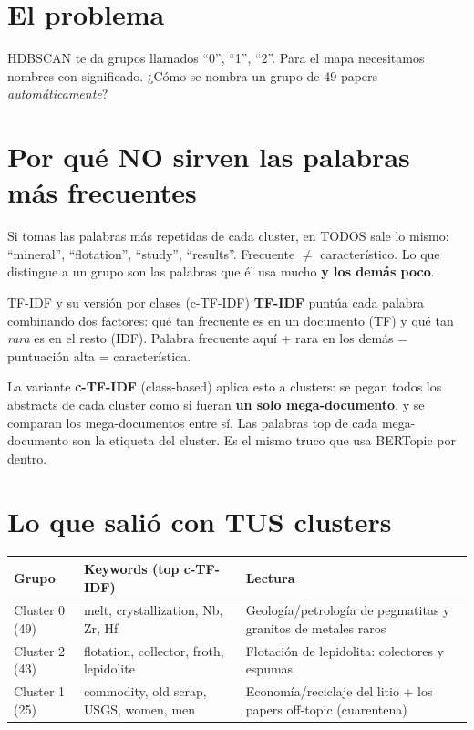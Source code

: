 \documentclass[11pt,a4paper]{article}
\begin{document}

\section{El problema}

HDBSCAN te da grupos llamados ``0'', ``1'', ``2''. Para el mapa necesitamos nombres con
significado. ¿Cómo se nombra un grupo de 49 papers \emph{automáticamente}?

\section{Por qué NO sirven las palabras más frecuentes}

Si tomas las palabras más repetidas de cada cluster, en TODOS sale lo mismo: ``mineral'',
``flotation'', ``study'', ``results''. Frecuente $\neq$ característico. Lo que distingue a un
grupo son las palabras que él usa mucho \textbf{y los demás poco}.

\begin{concepto}{TF-IDF y su versión por clases (c-TF-IDF)}
\textbf{TF-IDF} puntúa cada palabra combinando dos factores: qué tan frecuente es en un
documento (TF) y qué tan \emph{rara} es en el resto (IDF). Palabra frecuente aquí + rara en
los demás = puntuación alta = característica.

La variante \textbf{c-TF-IDF} (class-based) aplica esto a clusters: se pegan todos los
abstracts de cada cluster como si fueran \textbf{un solo mega-documento}, y se comparan los
mega-documentos entre sí. Las palabras top de cada mega-documento son la etiqueta del cluster.
Es el mismo truco que usa BERTopic por dentro.
\end{concepto}

\section{Lo que salió con TUS clusters}

\begin{center}
\begin{tabular}{lp{5.2cm}p{5.2cm}}
\textbf{Grupo} & \textbf{Keywords (top c-TF-IDF)} & \textbf{Lectura} \\
\hline
Cluster 0 (49) & melt, crystallization, Nb, Zr, Hf & Geología/petrología de pegmatitas y
granitos de metales raros \\
Cluster 2 (43) & flotation, collector, froth, lepidolite & Flotación de lepidolita:
colectores y espumas \\
Cluster 1 (25) & commodity, old scrap, USGS, women, men & Economía/reciclaje del litio + los
papers off-topic (cuarentena) \\
\end{tabular}
\end{center}
\end{document}
